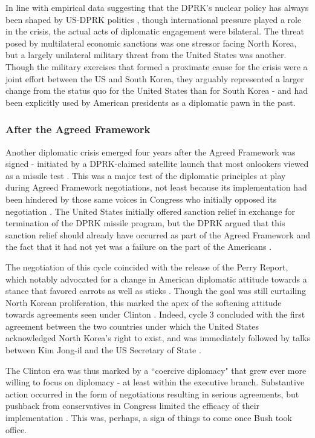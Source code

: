 \documentclass{article}
\begin{document}
In line with empirical data suggesting that the DPRK's nuclear policy has always been shaped by US-DPRK politics \cite{rich14}, though international pressure played a role in the crisis, the actual acts of diplomatic engagement were bilateral. The threat posed by multilateral economic sanctions was one stressor facing North Korea, but a largely unilateral military threat from the United States was another. Though the military exercises that formed a proximate cause for the crisis were a joint effort between the US and South Korea, they arguably represented a larger change from the status quo for the United States than for South Korea - and had been explicitly used by American presidents as a diplomatic pawn in the past.

\subsubsection{After the Agreed Framework}

Another diplomatic crisis emerged four years after the Agreed Framework was signed - initiated by a DPRK-claimed satellite launch that most onlookers viewed as a missile test \cite{orfall}. This was a major test of the diplomatic principles at play during Agreed Framework negotiations, not least because its implementation had been hindered by those same voices in Congress who initially opposed its negotiation \cite{hecker2}. The United States initially offered sanction relief in exchange for termination of the DPRK missile program, but the DPRK argued that this sanction relief should already have occurred as part of the Agreed Framework and the fact that it had not yet was a failure on the part of the Americans \cite{davenport}.

The negotiation of this cycle coincided with the release of the Perry Report, which notably advocated for a change in American diplomatic attitude towards a stance that favored carrots as well as sticks \cite{perry}. Though the goal was still curtailing North Korean proliferation, this marked the apex of the softening attitude towards agreements seen under Clinton \cite{bleiker}. Indeed, cycle 3 concluded with the first agreement between the two countries under which the United States acknowledged North Korea's right to exist, and was immediately followed by talks between Kim Jong-il and the US Secretary of State \cite{hecker2}.
			
The Clinton era was thus marked by a ``coercive diplomacy" that grew ever more willing to focus on diplomacy - at least within the executive branch. Substantive action occurred in the form of negotiations resulting in serious agreements, but pushback from conservatives in Congress limited the efficacy of their implementation \cite{harnisch}. This was, perhaps, a sign of things to come once Bush took office.
	
\end{document}
